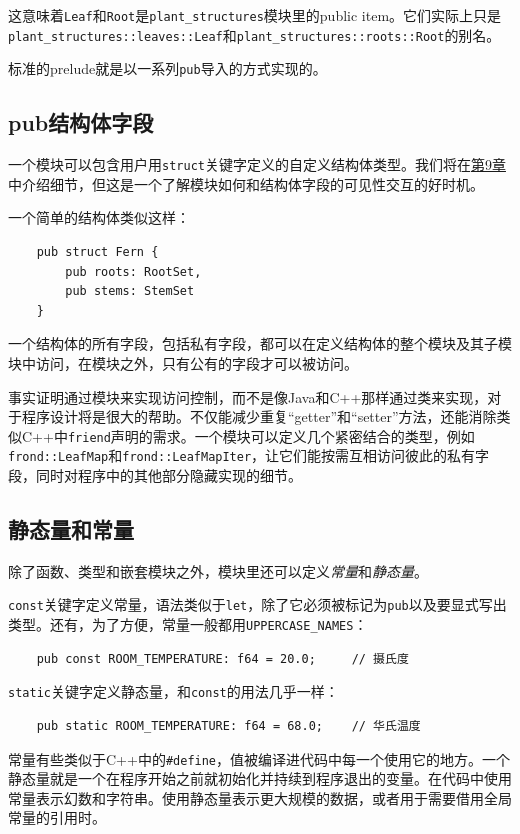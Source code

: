 这意味着\texttt{Leaf}和\texttt{Root}是\texttt{plant\_structures}模块里的public item。它们实际上只是\\
\texttt{plant\_structures::leaves::Leaf}和\texttt{plant\_structures::roots::Root}的别名。

标准的prelude就是以一系列\texttt{pub}导入的方式实现的。

\subsection{pub结构体字段}
一个模块可以包含用户用\texttt{struct}关键字定义的自定义结构体类型。我们将在\hyperref[ch09]{第9章}中介绍细节，但这是一个了解模块如何和结构体字段的可见性交互的好时机。

一个简单的结构体类似这样：
\begin{verbatim}
    pub struct Fern {
        pub roots: RootSet,
        pub stems: StemSet
    }
\end{verbatim}

一个结构体的所有字段，包括私有字段，都可以在定义结构体的整个模块及其子模块中访问，在模块之外，只有公有的字段才可以被访问。

事实证明通过模块来实现访问控制，而不是像Java和C++那样通过类来实现，对于程序设计将是很大的帮助。不仅能减少重复“getter”和“setter”方法，还能消除类似C++中\texttt{friend}声明的需求。一个模块可以定义几个紧密结合的类型，例如\texttt{frond::LeafMap}和\texttt{frond::LeafMapIter}，让它们能按需互相访问彼此的私有字段，同时对程序中的其他部分隐藏实现的细节。

\subsection{静态量和常量}

除了函数、类型和嵌套模块之外，模块里还可以定义\emph{常量}和\emph{静态量}。

\texttt{const}关键字定义常量，语法类似于\texttt{let}，除了它必须被标记为\texttt{pub}以及要显式写出类型。还有，为了方便，常量一般都用\texttt{UPPERCASE\_NAMES}：
\begin{verbatim}
    pub const ROOM_TEMPERATURE: f64 = 20.0;     // 摄氏度
\end{verbatim}

\texttt{static}关键字定义静态量，和\texttt{const}的用法几乎一样：
\begin{verbatim}
    pub static ROOM_TEMPERATURE: f64 = 68.0;    // 华氏温度
\end{verbatim}

常量有些类似于C++中的\texttt{\#define}，值被编译进代码中每一个使用它的地方。一个静态量就是一个在程序开始之前就初始化并持续到程序退出的变量。在代码中使用常量表示幻数和字符串。使用静态量表示更大规模的数据，或者用于需要借用全局常量的引用时。

